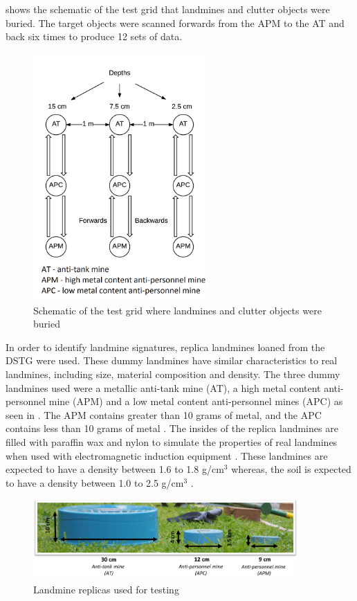 \documentclass[main.tex]{subfiles}
\begin{document}
 shows the schematic of the test grid that landmines and clutter objects were buried. The target objects were scanned forwards from the APM to the AT and back six times to produce 12 sets of data. 

\begin{figure}[ht]
\includegraphics[width=0.6\textwidth]{5-Testing/testlane.png}
\centering
\caption[Schematic of test grid]{Schematic of the test grid where landmines and clutter objects were buried}
\end{figure}

In order to identify landmine signatures, replica landmines loaned from the DSTG were used. These dummy landmines have similar characteristics to real landmines, including size, material composition and density. The three dummy landmines used were a metallic anti-tank mine (AT), a high metal content anti-personnel mine (APM) and a low metal content anti-personnel mines (APC) as seen in . The APM contains greater than 10 grams of metal, and the APC contains less than 10 grams of metal \parencite{chant2005dsto}. The insides of the replica landmines are filled with paraffin wax and nylon to simulate the properties of real landmines when used with electromagnetic induction equipment \parencite{chant2005dsto}. These landmines are expected to have a density between 1.6 to 1.8 g/cm$^3$ whereas, the soil is expected to have a density between 1.0 to 2.5 g/cm$^3$ \parencite{das2002soil}.		
\begin{figure}[ht]
\includegraphics[width=0.9\textwidth]{5-Testing/dummy.PNG}
\centering
\caption{Landmine replicas used for testing }
\end{figure}
%
%
%
\end{document}
